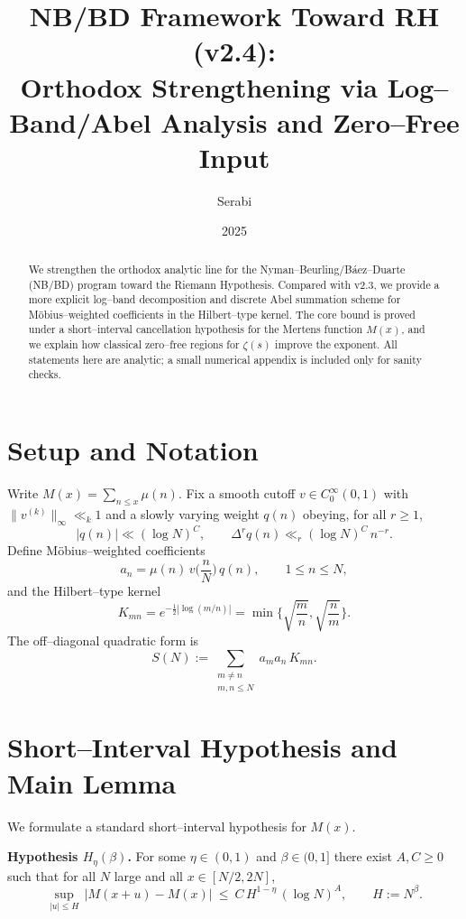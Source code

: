 \documentclass[11pt]{article}
\title{NB/BD Framework Toward RH (v2.4):\\
Orthodox Strengthening via Log--Band/Abel Analysis and Zero--Free Input}
\author{Serabi}
\date{2025}
\theoremstyle{remark}
\begin{document}
\maketitle

\begin{abstract}
We strengthen the orthodox analytic line for the Nyman--Beurling/B\'aez--Duarte (NB/BD) program toward the Riemann Hypothesis.
Compared with v2.3, we provide a more explicit log--band decomposition and discrete Abel summation scheme for M\"obius--weighted coefficients in the Hilbert--type kernel.
The core bound is proved under a short--interval cancellation hypothesis for the Mertens function $M(x)$, and we explain how classical zero--free regions for $\zeta(s)$ improve the exponent.
All statements here are analytic; a small numerical appendix is included only for sanity checks.
\end{abstract}

\section{Setup and Notation}
Write $M(x)=\sum_{n\le x}\mu(n)$.
Fix a smooth cutoff $v\in C_0^\infty(0,1)$ with $\|v^{(k)}\|_\infty\ll_k 1$ and a slowly varying weight $q(n)$ obeying, for all $r\ge 1$,
\begin{equation}\label{eq:qdiff}
|q(n)|\ll (\log N)^C,\qquad \Delta^r q(n)\ll_r (\log N)^C\, n^{-r}.
\end{equation}
Define M\"obius--weighted coefficients
\begin{equation}\label{eq:an}
a_n=\mu(n)\,v\!\Big(\frac{n}{N}\Big)\,q(n),\qquad 1\le n\le N,
\end{equation}
and the Hilbert--type kernel
\begin{equation}\label{eq:K}
K_{mn}=e^{-\frac12|\log(m/n)|}=\min\!\Big\{\sqrt{\frac{m}{n}},\sqrt{\frac{n}{m}}\Big\}.
\end{equation}
The off--diagonal quadratic form is
\begin{equation}\label{eq:S}
S(N):=\sum_{\substack{m\ne n\\ m,n\le N}} a_m a_n\,K_{mn}.
\end{equation}

\section{Short--Interval Hypothesis and Main Lemma}
We formulate a standard short--interval hypothesis for $M(x)$.

\medskip
\noindent\textbf{Hypothesis $H_\eta(\beta)$.} For some $\eta\in(0,1)$ and $\beta\in(0,1]$ there exist $A,C\ge 0$ such that for all $N$ large and all $x\in[N/2,2N]$,
\begin{equation}\label{eq:Heta}
\sup_{|u|\le H}\,|M(x+u)-M(x)|\ \le\ C\, H^{1-\eta}\,(\log N)^A,\qquad H:=N^{\beta}.
\end{equation}
\end{document}
